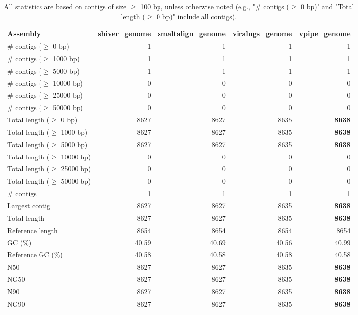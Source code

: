 \documentclass[12pt,a4paper]{article}
\begin{document}
\begin{table}[ht]
\begin{center}
\caption{All statistics are based on contigs of size $\geq$ 100 bp, unless otherwise noted (e.g., "\# contigs ($\geq$ 0 bp)" and "Total length ($\geq$ 0 bp)" include all contigs).}
\begin{tabular}{|l*{4}{|r}|}
\hline
Assembly & shiver\_genome & smaltalign\_genome & viralngs\_genome & vpipe\_genome \\ \hline
\# contigs ($\geq$ 0 bp) & 1 & 1 & 1 & 1 \\ \hline
\# contigs ($\geq$ 1000 bp) & 1 & 1 & 1 & 1 \\ \hline
\# contigs ($\geq$ 5000 bp) & 1 & 1 & 1 & 1 \\ \hline
\# contigs ($\geq$ 10000 bp) & 0 & 0 & 0 & 0 \\ \hline
\# contigs ($\geq$ 25000 bp) & 0 & 0 & 0 & 0 \\ \hline
\# contigs ($\geq$ 50000 bp) & 0 & 0 & 0 & 0 \\ \hline
Total length ($\geq$ 0 bp) & 8627 & 8627 & 8635 & {\bf 8638} \\ \hline
Total length ($\geq$ 1000 bp) & 8627 & 8627 & 8635 & {\bf 8638} \\ \hline
Total length ($\geq$ 5000 bp) & 8627 & 8627 & 8635 & {\bf 8638} \\ \hline
Total length ($\geq$ 10000 bp) & 0 & 0 & 0 & 0 \\ \hline
Total length ($\geq$ 25000 bp) & 0 & 0 & 0 & 0 \\ \hline
Total length ($\geq$ 50000 bp) & 0 & 0 & 0 & 0 \\ \hline
\# contigs & 1 & 1 & 1 & 1 \\ \hline
Largest contig & 8627 & 8627 & 8635 & {\bf 8638} \\ \hline
Total length & 8627 & 8627 & 8635 & {\bf 8638} \\ \hline
Reference length & 8654 & 8654 & 8654 & 8654 \\ \hline
GC (\%) & 40.59 & 40.69 & 40.56 & 40.99 \\ \hline
Reference GC (\%) & 40.58 & 40.58 & 40.58 & 40.58 \\ \hline
N50 & 8627 & 8627 & 8635 & {\bf 8638} \\ \hline
NG50 & 8627 & 8627 & 8635 & {\bf 8638} \\ \hline
N90 & 8627 & 8627 & 8635 & {\bf 8638} \\ \hline
NG90 & 8627 & 8627 & 8635 & {\bf 8638} \\ \hline

\end{tabular}
\end{center}
\end{table}
\end{document}
